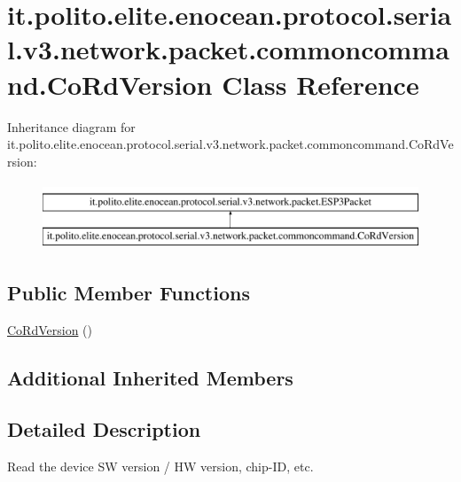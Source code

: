 \hypertarget{classit_1_1polito_1_1elite_1_1enocean_1_1protocol_1_1serial_1_1v3_1_1network_1_1packet_1_1commoncommand_1_1_co_rd_version}{}\section{it.\+polito.\+elite.\+enocean.\+protocol.\+serial.\+v3.\+network.\+packet.\+commoncommand.\+Co\+Rd\+Version Class Reference}
\label{classit_1_1polito_1_1elite_1_1enocean_1_1protocol_1_1serial_1_1v3_1_1network_1_1packet_1_1commoncommand_1_1_co_rd_version}
Inheritance diagram for it.\+polito.\+elite.\+enocean.\+protocol.\+serial.\+v3.\+network.\+packet.\+commoncommand.\+Co\+Rd\+Version\+:\begin{figure}[H]
\begin{center}
\leavevmode
\includegraphics[height=2.000000cm]{classit_1_1polito_1_1elite_1_1enocean_1_1protocol_1_1serial_1_1v3_1_1network_1_1packet_1_1commoncommand_1_1_co_rd_version}
\end{center}
\end{figure}
\subsection*{Public Member Functions}
\begin{DoxyCompactItemize}
\item 
\hyperlink{classit_1_1polito_1_1elite_1_1enocean_1_1protocol_1_1serial_1_1v3_1_1network_1_1packet_1_1commoncommand_1_1_co_rd_version_af4c5b80dba48ccad7e6f94b674a11a87}{Co\+Rd\+Version} ()
\end{DoxyCompactItemize}
\subsection*{Additional Inherited Members}


\subsection{Detailed Description}
Read the device SW version / HW version, chip-\/\+ID, etc.

